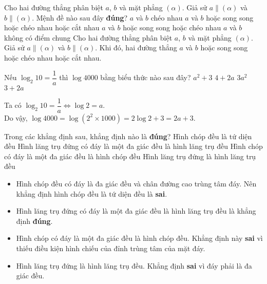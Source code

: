 \begin{ex}%
	Cho hai đường thẳng phân biệt $a$, $b$ và mặt phẳng $(\alpha)$. Giả sử $a \parallel (\alpha)$ và $b \parallel (\alpha)$. Mệnh đề nào sau đây \textbf{đúng}?
	\choice
	{$a$ và $b$ chéo nhau}
	{\True $a$ và $b$ hoặc song song hoặc chéo nhau hoặc cắt nhau}
	{$a$ và $b$ hoặc song song hoặc chéo nhau}
	{$a$ và $b$ không có điểm chung}
	\loigiai
	{
		Cho hai đường thẳng phân biệt $a$, $b$ và mặt phẳng $(\alpha)$. Giả sử $a\parallel (\alpha)$ và $b\parallel (\alpha)$. Khi đó, hai đường thẳng $a$ và $b$ hoặc song song hoặc chéo nhau hoặc cắt nhau.
	}
\end{ex}
\begin{ex}%
Nếu $ \log_2 {10} =\dfrac{1}{a} $ thì $ \log 4000 $ bằng biểu thức nào sau đây?
\choice
{$ a^2 + 3 $}
{$ 4 + 2a $}
{$ 3a^2 $}
{\True $ 3 + 2a $}
\loigiai
{Ta có $ \log_2{10} = \dfrac{1}{a} \Leftrightarrow \log 2 = a.$ \\
	Do vậy, $ \log 4000 = \log (2^2 \times 1000) = 2 \log 2 + 3 = 2a + 3. $

}
\end{ex}
\begin{ex}%
Trong các khẳng định sau, khẳng định nào là \textbf{đúng}?	
	\choice
	{ Hình chóp đều là tứ diện đều}
	{\True Hình lăng trụ đứng có đáy là một đa giác đều là hình lăng trụ đều}
	{Hình chóp có đáy là một đa giác đều là hình chóp đều}
	{Hình lăng trụ đứng là hình lăng trụ đều}
	\loigiai
	{\begin{itemize}
			\item Hình chóp đều có đáy là đa giác đều và chân đường cao trùng tâm đáy. Nên khẳng định hình chóp đều là tứ diện đều là \textbf{sai}.
			\item Hình lăng trụ đứng có đáy là một đa giác đều là hình lăng trụ đều là khẳng định \textbf{đúng}.
			\item Hình chóp có đáy là một đa giác đều là hình chóp đều. Khẳng định này \textbf{sai} vì thiếu điều kiện hình chiếu của đỉnh trùng tâm của mặt đáy.
			\item Hình lăng trụ đứng là hình lăng trụ đều. Khẳng định \textbf{sai} vì đáy phải là đa giác đều.
		\end{itemize}
		
	}
\end{ex}

